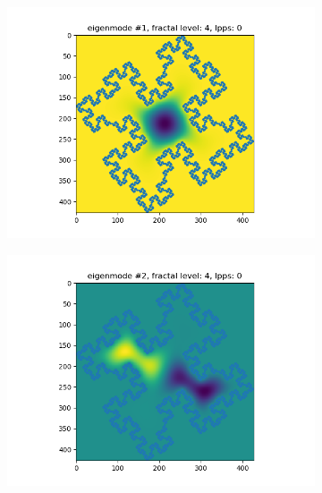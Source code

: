 \documentclass{article}
\begin{document}
\begin{figure}
    \begin{subfigure}{0.3\textwidth}
        \includegraphics[width=\linewidth]{../figs/eigenmode_2d1.png}
    \end{subfigure}
    \begin{subfigure}{0.3\textwidth}
        \includegraphics[width=\linewidth]{../figs/eigenmode_2d2.png}
    \end{subfigure}
    \begin{subfigure}{0.3\textwidth}

\end{subfigure}
\end{figure}
\end{document}
